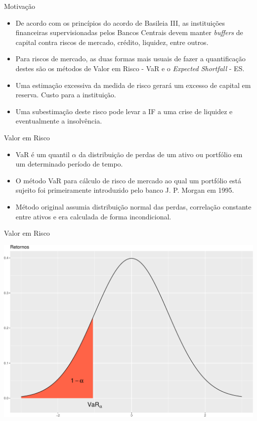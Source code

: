 \documentclass[ignorenonframetext,]{beamer}
\providecommand{\tightlist}{%
\setlength{\itemsep}{0pt}\setlength{\parskip}{0pt}}
\begin{document}
\begin{frame}{Motivação}

\begin{itemize}
\tightlist
\item
  De acordo com os princípios do acordo de Basileia III, as instituições
  financeiras supervisionadas pelos Bancos Centrais devem manter
  \emph{buffers} de capital contra riscos de mercado, crédito, liquidez,
  entre outros.
\item
  Para riscos de mercado, as duas formas mais usuais de fazer a
  quantificação destes são os métodos de Valor em Risco - VaR e o
  \emph{Expected Shortfall} - ES.
\item
  Uma estimação excessiva da medida de risco gerará um excesso de
  capital em reserva. Custo para a instituição.
\item
  Uma subestimação deste risco pode levar a IF a uma crise de liquidez e
  eventualmente a insolvência.
\end{itemize}

\end{frame}

\begin{frame}{Valor em Risco}

\begin{itemize}
\tightlist
\item
  VaR é um quantil \(\alpha\) da distribuição de perdas de um ativo ou
  portfólio em um determinado período de tempo.
\item
  O método VaR para cálculo de risco de mercado ao qual um portfólio
  está sujeito foi primeiramente introduzido pelo banco J. P. Morgan em
  1995.
\item
  Método original assumia distribuição normal das perdas, correlação
  constante entre ativos e era calculada de forma incondicional.
\end{itemize}

\end{frame}

\begin{frame}{Valor em Risco}

\includegraphics{artigo-apresentacao_files/figure-beamer/var-1.pdf}

\end{frame}
\end{document}
